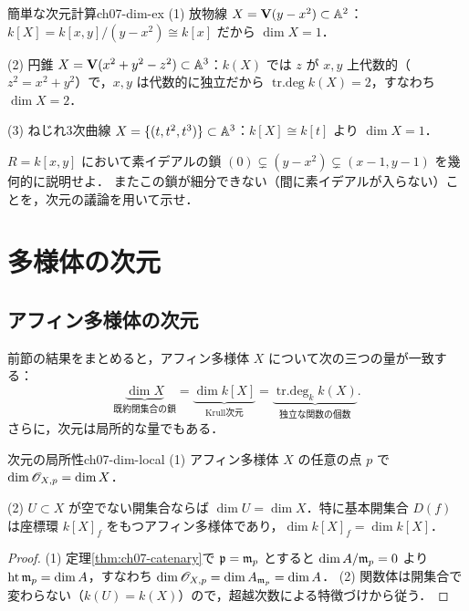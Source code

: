 \begin{myex}{簡単な次元計算}{ch07-dim-ex}
(1) 放物線 $X=\mathbf{V}(y-x^2)\subset\mathbb{A}^2$：$k[X]=k[x,y]/(y-x^2)\cong k[x]$ だから $\dim X=1$．

(2) 円錐 $X=\mathbf{V}(x^2+y^2-z^2)\subset\mathbb{A}^3$：$k(X)$ では $z$ が $x,y$ 上代数的（$z^2=x^2+y^2$）で，$x,y$ は代数的に独立だから
$\mathop{\mathrm{tr.deg}}\nolimits k(X)=2$，すなわち $\dim X=2$．

(3) ねじれ3次曲線 $X=\{(t,t^2,t^3)\}\subset\mathbb{A}^3$：$k[X]\cong k[t]$ より $\dim X=1$．
\end{myex}

$R=k[x,y]$ において素イデアルの鎖 $(0)\subsetneq(y-x^2)\subsetneq(x-1,y-1)$ を幾何的に説明せよ．
またこの鎖が細分できない（間に素イデアルが入らない）ことを，次元の議論を用いて示せ．

\section{多様体の次元}

\subsection{アフィン多様体の次元}

前節の結果をまとめると，アフィン多様体 $X$ について次の三つの量が一致する：
\[
  \underbrace{\dim X}_{\text{既約閉集合の鎖}}
  =\underbrace{\dim k[X]}_{\text{Krull次元}}
  =\underbrace{\mathop{\mathrm{tr.deg}}\nolimits_k k(X)}_{\text{独立な関数の個数}}.
\]
さらに，次元は局所的な量でもある．

\begin{myprop}{次元の局所性}{ch07-dim-local}
(1) アフィン多様体 $X$ の任意の点 $p$ で $\dim\mathscr{O}_{X,p}=\dim X$．

(2) $U\subset X$ が空でない開集合ならば $\dim U=\dim X$．特に基本開集合 $D(f)$ は座標環 $k[X]_f$ をもつアフィン多様体であり，$\dim k[X]_f=\dim k[X]$．
\end{myprop}

\begin{proof}
(1) 定理\ref{thm:ch07-catenary}で $\mathfrak{p}=\mathfrak{m}_p$ とすると $\dim A/\mathfrak{m}_p=0$ より $\operatorname{ht}\mathfrak{m}_p=\dim A$，すなわち $\dim\mathscr{O}_{X,p}=\dim A_{\mathfrak{m}_p}=\dim A$．
(2) 関数体は開集合で変わらない（$k(U)=k(X)$）ので，超越次数による特徴づけから従う．
\end{proof}

